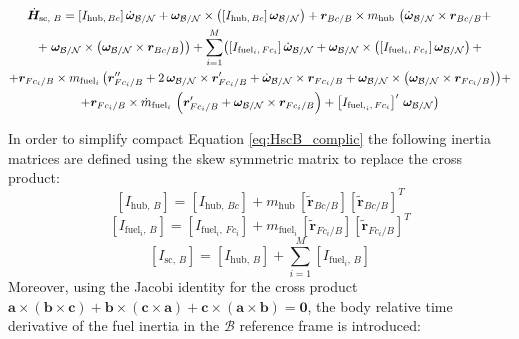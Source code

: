 \begin{multline}\label{eq:HscB_complic}
	\dot{\bm{H}}_{\text{sc, }B} = \left[I_{\text{hub},\,Bc}\right]\dot{\bm{\omega}}_{\cal{B}/\cal{N}} + \bm{\omega}_{\cal{B}/\cal{N}} \times \left(\left[I_{\text{hub},\,Bc}\right]\bm{\omega}_{\cal{B}/\cal{N}}\right) 
	+ \bm{r}_{Bc/B} \times m_\text{hub}\,\left(\dot{\bm{\omega}}_{\cal{B}/\cal{N}} \times \bm{r}_{Bc/B} +\right.\\
	+\left. \bm{\omega}_{\cal{B}/\cal{N}} \times \left(\bm{\omega}_{\cal{B}/\cal{N}} \times \bm{r}_{Bc/B}\right) \right) 
	+\sum_{i=1}^{M} \bigl(\left[I_{\text{fuel}_i,\,Fc_i}\right] \dot{\bm{\omega}}_{\cal{B}/\cal{N}} + \bm{\omega}_{\cal{B}/\cal{N}} \times \left(\left[I_{\text{fuel}_i,\,Fc_i}\right] \bm{\omega}_{\cal{B}/\cal{N}}\right) +\\ 
	+ \bm{r}_{Fc_i/B} \times m_{\text{fuel}_i}\, \bigl( \bm{r}''_{Fc_i/B} + 2\,\bm{\omega}_{\mathcal{B}/\mathcal{N}} \times \bm{r}'_{Fc_i/B}
	+ \dot{\bm{\omega}}_{\cal{B}/\cal{N}} \times \bm{r}_{Fc_i/B} + \bm{\omega}_{\cal{B}/\cal{N}} \times
	\left(\bm{\omega}_{\cal{B}/\cal{N}} \times \bm{r}_{Fc_i/B}\right) \bigr)+\\ 
	+
	\bm{r}_{Fc_i/B} \times \dot{m}_{\text{fuel}_i} \,\left(\bm{r}'_{Fc_i/B}+\bm{\omega}_{\cal{B}/\cal{N}} \times \bm{r}_{Fc_i/B}\right) 
	+ \left[I_{\text{fuel,}_i,\,Fc_i}\right]' \, \bm{\omega}_{\cal{B}/\cal{N}}\bigr)
\end{multline}

In order to simplify compact Equation \eqref{eq:HscB_complic} the following inertia matrices are defined using the skew symmetric matrix to replace the cross product:
\begin{equation}\label{eq:eq44}
	\left[I_{\text{hub},\,B}\right]= \left[I_{\text{hub},\,Bc}\right] + m_\text{hub}\, \left[\tilde{\bm{r}}_{Bc/B}\right]\left[\tilde{\bm{r}}_{Bc/B}\right]^T 
\end{equation}
\begin{equation}\label{eq:eq45}
	\left[I_{\text{fuel}_i,\,B}\right]= \left[I_{\text{fuel}_i,\,Fc_i}\right] + m_{\text{fuel}_i}\, \left[\tilde{\bm{r}}_{Fc_i/B}\right]\left[\tilde{\bm{r}}_{Fc_i/B}\right]^T
\end{equation}
\begin{equation}\label{eq:eq46}
	\left[I_{\text{sc, }B}\right]=  \left[I_{\text{hub},\,B}\right] + \sum_{i=1}^{M}\left[I_{\text{fuel}_i,\,B}\right]
\end{equation}
Moreover, using the Jacobi identity for the cross product $
\mathbf {a} \times (\mathbf {b} \times \mathbf {c} )+\mathbf {b} \times (\mathbf {c} \times \mathbf {a} )+\mathbf {c} \times (\mathbf {a} \times \mathbf {b} )=\mathbf {0}$, the body relative time derivative of the fuel inertia in the $\mathcal{B}$ reference frame is introduced:

